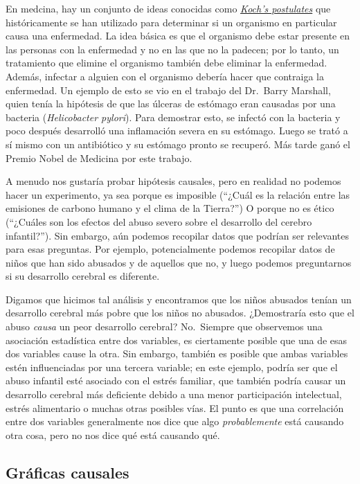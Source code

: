 \documentclass[
  12pt,
]{book}
\theoremstyle{definition}
\theoremstyle{definition}
\theoremstyle{definition}
\theoremstyle{remark}
\begin{document}
En medcina, hay un conjunto de ideas conocidas como \href{https://en.wikipedia.org/wiki/Koch\%27s_postulates}{\emph{Koch's postulates}} que históricamente se han utilizado para determinar si un organismo en particular causa una enfermedad. La idea básica es que el organismo debe estar presente en las personas con la enfermedad y no en las que no la padecen; por lo tanto, un tratamiento que elimine el organismo también debe eliminar la enfermedad. Además, infectar a alguien con el organismo debería hacer que contraiga la enfermedad. Un ejemplo de esto se vio en el trabajo del Dr.~Barry Marshall, quien tenía la hipótesis de que las úlceras de estómago eran causadas por una bacteria (\emph{Helicobacter pylori}). Para demostrar esto, se infectó con la bacteria y poco después desarrolló una inflamación severa en su estómago. Luego se trató a sí mismo con un antibiótico y su estómago pronto se recuperó. Más tarde ganó el Premio Nobel de Medicina por este trabajo.

A menudo nos gustaría probar hipótesis causales, pero en realidad no podemos hacer un experimento, ya sea porque es imposible (``¿Cuál es la relación entre las emisiones de carbono humano y el clima de la Tierra?'') O porque no es ético (``¿Cuáles son los efectos del abuso severo sobre el desarrollo del cerebro infantil?''). Sin embargo, aún podemos recopilar datos que podrían ser relevantes para esas preguntas. Por ejemplo, potencialmente podemos recopilar datos de niños que han sido abusados y de aquellos que no, y luego podemos preguntarnos si su desarrollo cerebral es diferente.

Digamos que hicimos tal análisis y encontramos que los niños abusados tenían un desarrollo cerebral más pobre que los niños no abusados. ¿Demostraría esto que el abuso \emph{causa} un peor desarrollo cerebral? No.~Siempre que observemos una asociación estadística entre dos variables, es ciertamente posible que una de esas dos variables cause la otra. Sin embargo, también es posible que ambas variables estén influenciadas por una tercera variable; en este ejemplo, podría ser que el abuso infantil esté asociado con el estrés familiar, que también podría causar un desarrollo cerebral más deficiente debido a una menor participación intelectual, estrés alimentario o muchas otras posibles vías. El punto es que una correlación entre dos variables generalmente nos dice que algo \emph{probablemente} está causando otra cosa, pero no nos dice qué está causando qué.

\hypertarget{gruxe1ficas-causales}{%
\subsection{Gráficas causales}\label{gruxe1ficas-causales}}
\end{document}
